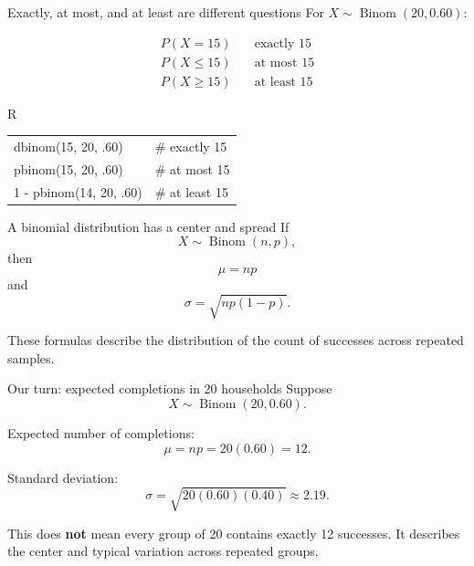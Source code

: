 \documentclass[11pt,aspectratio=169]{beamer}
\begin{document}
\begin{frame}{Exactly, at most, and at least are different questions}
For $X\sim\operatorname{Binom}(20,0.60)$:

\begin{align*}
P(X=15) &\quad \text{exactly 15}\\
P(X\leq 15) &\quad \text{at most 15}\\
P(X\geq 15) &\quad \text{at least 15}
\end{align*}

\vfill
\begin{block}{R}
\ttfamily
\begin{tabular}{ll}
dbinom(15, 20, .60) & \# exactly 15\\
pbinom(15, 20, .60) & \# at most 15\\
1 - pbinom(14, 20, .60) & \# at least 15
\end{tabular}
\end{block}
\end{frame}

\begin{frame}{A binomial distribution has a center and spread}
If
\[
X\sim\operatorname{Binom}(n,p),
\]
then
\[
\boxed{\mu=np}
\]
and
\[
\boxed{\sigma=\sqrt{np(1-p)}}.
\]

\vfill
These formulas describe the distribution of the \alert{count of successes} across repeated samples.
\end{frame}

\begin{frame}{Our turn: expected completions in 20 households}
Suppose
\[
X\sim\operatorname{Binom}(20,0.60).
\]

Expected number of completions:
\[
\mu=np=20(0.60)=\boxed{12}.
\]

Standard deviation:
\[
\sigma=\sqrt{20(0.60)(0.40)}\approx\boxed{2.19}.
\]

\vfill
This does \textbf{not} mean every group of 20 contains exactly 12 successes. It describes the center and typical variation across repeated groups.
\end{frame}
\end{document}
